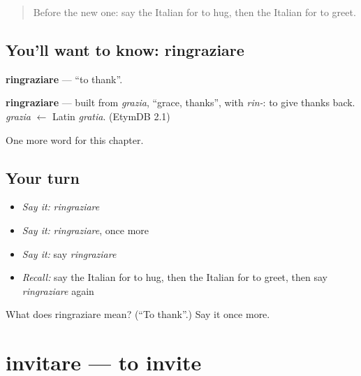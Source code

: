 \label{lesson:IT-C174-ringraziare}



\begin{quote}
Before the new one: say the Italian for to hug, then the Italian for to greet.
\end{quote}

\subsection*{You'll want to know: ringraziare}
\textbf{ringraziare} — \textquotedblleft{}to thank\textquotedblright{}.

\begin{cousinweb}
\textbf{ringraziare} — built from \emph{grazia}, \textquotedblleft{}grace, thanks\textquotedblright{}, with \emph{rin-}: to give thanks back. \emph{grazia} $\leftarrow$ Latin \emph{gratia}. (EtymDB 2.1)
\end{cousinweb}

\begin{grammarlens}[title={What you've built}]
One more word for this chapter.
\end{grammarlens}

\subsection*{Your turn}
\begin{itemize}
\raggedright
  \item \emph{Say it:} \emph{ringraziare}
  \item \emph{Say it:} \emph{ringraziare}, once more
  \item \emph{Say it:} say \emph{ringraziare}
  \item \emph{Recall:} say the Italian for to hug, then the Italian for to greet, then say \emph{ringraziare} again
\end{itemize}

\begin{tcolorbox}[breakable,colback=teal!4,colframe=teal!35!black,title={Before you move on}]
What does ringraziare mean? (\textquotedblleft{}To thank\textquotedblright{}.) Say it once more.
\end{tcolorbox}
\section[invitare]{invitare — to invite}

\label{lesson:IT-C174-invitare}



